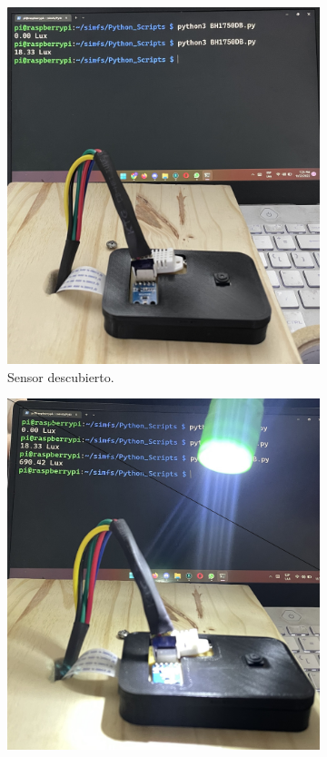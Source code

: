 \begin{figure}[H]
\begin{subfigure}{0.33\textwidth}
        \includegraphics[width=\linewidth]{ImagenesValidacion del prototipo/TINTFUN3b}
        \caption{Sensor descubierto.}
	\end{subfigure}\hfill
    \begin{subfigure}{0.33\textwidth}
    	\centering
        \includegraphics[width=\linewidth]{ImagenesValidacion del prototipo/TINTFUN3c}

\end{subfigure}
\end{figure}
